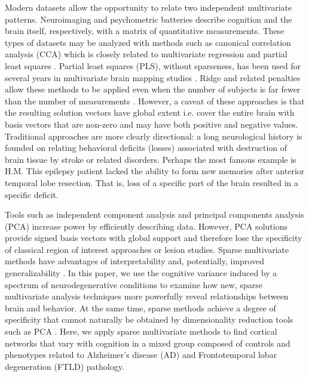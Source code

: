 \documentclass[preprint,authoryear,12pt]{elsarticle}
\begin{document}
Modern datasets allow the opportunity to relate two independent multivariate patterns.  Neuroimaging and psychometric batteries describe cognition and the brain itself, respectively, with a matrix of quantitative measurements.  These types of datasets may be analyzed with methods such as canonical correlation analysis (CCA) \citet{cherry} which is closely related to multivariate regression and partial least squares \citet{Sun2009}.  Partial least squares (PLS), without sparseness, has been used for several years in multivariate brain mapping studies \citet{McIntosh1996,Leibovitch1999,Lin2003,Addis2004a,Chen2009a}.  Ridge and related penalties allow these methods to be applied even when the number of subjects is far fewer than the number of measurements \citet{Nestor2002}.  However, a caveat of these approaches is that the resulting solution vectors have global extent i.e. cover the entire brain with basis vectors that are non-zero and may have both positive and negative values.  Traditional approaches are more clearly directional: a long neurological history is founded on relating behavioral deficits (losses) associated with destruction of brain tissue by stroke or related disorders.  Perhaps the most famous example is H.M.  This epilepsy patient lacked the ability to form new memories after anterior temporal lobe resection.  That is, loss of a specific part of the brain resulted in a specific deficit.  

Tools such as independent component analysis and principal components analysis (PCA) \citet{mansfield_analytic_1977,comon_independent_1994,yeung_principal_2001,Borroni2012,Shamy2011} increase power by efficiently describing data.  However, PCA solutions provide signed basis vectors with global support and therefore lose the specificity of classical region of interest approaches or lesion studies.  Sparse multivariate methods have advantages of interpretability \citet{lee_learning_1999,Suykens2002} and, potentially, improved generalizability \citet{elad_why_2006,Zhang2008,Yamashita2008,Ryali2010,zibulevsky_l1-l2_2010}.  In this paper, we use the cognitive variance induced by a spectrum of neurodegenerative conditions to examine how new, sparse multivariate analysis techniques more powerfully reveal relationships between brain and behavior.  At the same time, sparse methods achieve a degree of specificity that cannot naturally be obtained by dimensionality reduction tools such as PCA \citet{lee_learning_1999}.  Here, we apply sparse multivariate methods to find cortical networks that vary with cognition in a mixed group composed of controls and phenotypes related to Alzheimer's disease (AD) and Frontotemporal lobar degeneration (FTLD) pathology.
\end{document}

